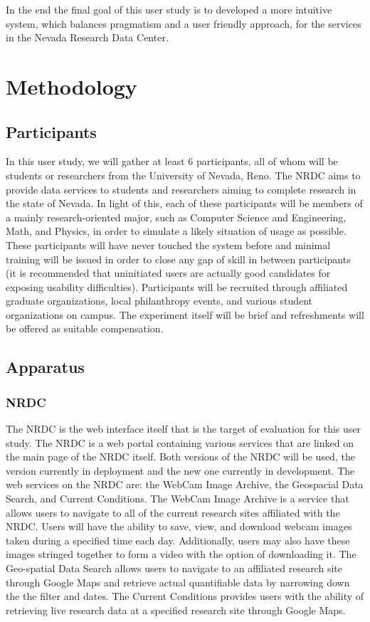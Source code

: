 \documentclass{article}
\begin{document}
In the end the final goal of this user study is to developed a more intuitive system, which balances pragmatism and a user friendly approach, for the services in the Nevada Research Data Center.

%
%
\section{Methodology}
%
\subsection{Participants}
In this user study, we will gather at least 6 participants, all of whom will be students or researchers from the University of Nevada, Reno. The NRDC aims to provide data services to students and researchers aiming to complete research in the state of Nevada. In light of this, each of these participants will be members of a mainly research-oriented major, such as Computer Science and Engineering, Math, and Physics, in order to simulate a likely situation of usage as possible. These participants will have never touched the system before and minimal training will be issued in order to close any gap of skill in between participants (it is recommended that uninitiated users are actually good candidates for exposing usability difficulties\cite{dontmakemethink}). Participants will be recruited through affiliated graduate organizations, local philanthropy events, and various student organizations on campus. The experiment itself will be brief and refreshments will be offered as suitable compensation.

%
\subsection{Apparatus}
\subsubsection{NRDC}
The NRDC is the web interface itself that is the target of evaluation for this user study. The NRDC is a web portal containing various services that are linked on the main page of the NRDC itself. Both versions of the NRDC will be used, the version currently in deployment and the new one currently in development. The web services on the NRDC are: the WebCam Image Archive, the Geospacial Data Search, and Current Conditions. The WebCam Image Archive is a service that allows users to navigate to all of the current research sites affiliated with the NRDC. Users will have the ability to save, view, and download webcam images taken during a specified time each day. Additionally, users may also have these images stringed together to form a video with the option of downloading it. The Geo-spatial Data Search allows users to navigate to an affiliated research site through Google Maps and retrieve actual quantifiable data by narrowing down the the filter and dates. The Current Conditions provides users with the ability of retrieving live research data at a specified research site through Google Maps.
\end{document}

